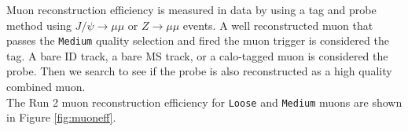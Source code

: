 \indent Muon reconstruction efficiency is measured in data by using a tag and probe method using $J/\psi\rightarrow \mu\mu$ or $Z\rightarrow\mu\mu$ events.  A well reconstructed muon that passes the {\tt Medium} quality selection and fired the muon trigger is considered the tag.  A bare ID track, a bare MS track, or a calo-tagged muon is considered the probe.  Then we search to see if the probe is also reconstructed as a high quality combined muon.  \\ %


\indent The Run 2 muon reconstruction efficiency for {\tt Loose} and {\tt Medium} muons are shown in Figure \ref{fig:muoneff}. \\




